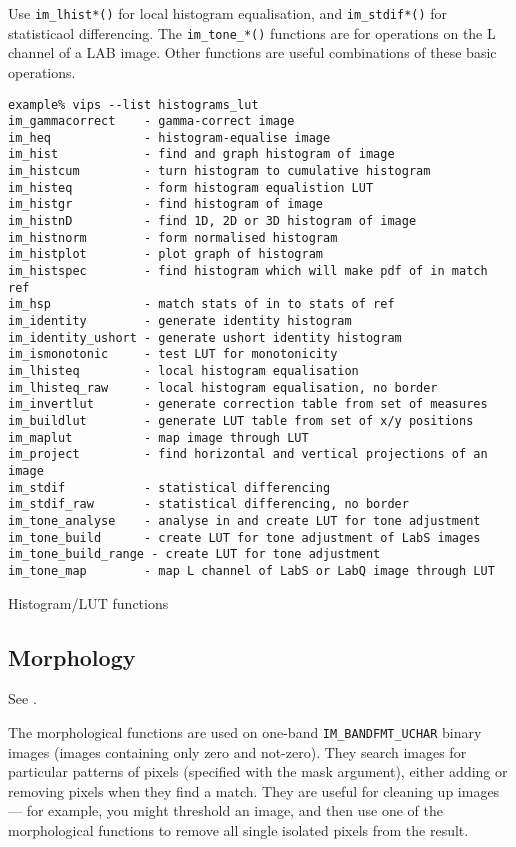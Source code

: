 Use \verb+im_lhist*()+ for local histogram equalisation, and
\verb+im_stdif*()+ for statisticaol differencing. The \verb+im_tone_*()+
functions are for operations on the L channel of a LAB image. Other
functions are useful combinations of these basic operations.

\begin{fig2}
\begin{verbatim}
example% vips --list histograms_lut
im_gammacorrect    - gamma-correct image
im_heq             - histogram-equalise image
im_hist            - find and graph histogram of image
im_histcum         - turn histogram to cumulative histogram
im_histeq          - form histogram equalistion LUT
im_histgr          - find histogram of image
im_histnD          - find 1D, 2D or 3D histogram of image
im_histnorm        - form normalised histogram
im_histplot        - plot graph of histogram
im_histspec        - find histogram which will make pdf of in match ref
im_hsp             - match stats of in to stats of ref
im_identity        - generate identity histogram
im_identity_ushort - generate ushort identity histogram
im_ismonotonic     - test LUT for monotonicity
im_lhisteq         - local histogram equalisation
im_lhisteq_raw     - local histogram equalisation, no border
im_invertlut       - generate correction table from set of measures
im_buildlut        - generate LUT table from set of x/y positions
im_maplut          - map image through LUT
im_project         - find horizontal and vertical projections of an image
im_stdif           - statistical differencing
im_stdif_raw       - statistical differencing, no border
im_tone_analyse    - analyse in and create LUT for tone adjustment
im_tone_build      - create LUT for tone adjustment of LabS images
im_tone_build_range - create LUT for tone adjustment
im_tone_map        - map L channel of LabS or LabQ image through LUT
\end{verbatim}
\caption{Histogram/LUT functions}
\label{fg:hist}
\end{fig2}
  
\subsection{Morphology}

See .

The morphological functions are used on one-band \verb+IM_BANDFMT_UCHAR+ binary
images (images containing only zero and not-zero). They search images
for particular patterns of pixels (specified with the mask argument),
either adding or removing pixels when they find a match. They are useful
for cleaning up images --- for example, you might threshold an image, and
then use one of the morphological functions to remove all single isolated
pixels from the result.

